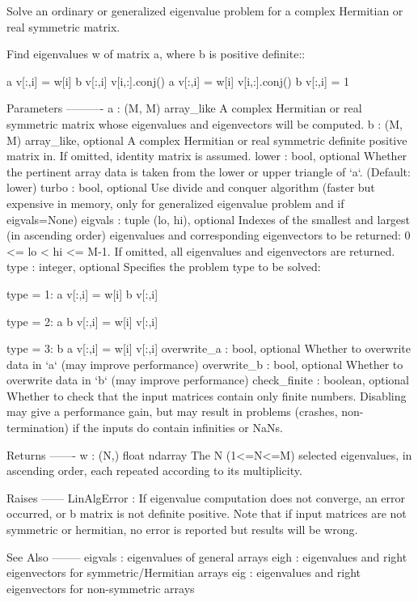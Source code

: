 \begin{DoxyVerb}Solve an ordinary or generalized eigenvalue problem for a complex
Hermitian or real symmetric matrix.

Find eigenvalues w of matrix a, where b is positive definite::

                  a v[:,i] = w[i] b v[:,i]
    v[i,:].conj() a v[:,i] = w[i]
    v[i,:].conj() b v[:,i] = 1


Parameters
----------
a : (M, M) array_like
    A complex Hermitian or real symmetric matrix whose eigenvalues and
    eigenvectors will be computed.
b : (M, M) array_like, optional
    A complex Hermitian or real symmetric definite positive matrix in.
    If omitted, identity matrix is assumed.
lower : bool, optional
    Whether the pertinent array data is taken from the lower or upper
    triangle of `a`. (Default: lower)
turbo : bool, optional
    Use divide and conquer algorithm (faster but expensive in memory,
    only for generalized eigenvalue problem and if eigvals=None)
eigvals : tuple (lo, hi), optional
    Indexes of the smallest and largest (in ascending order) eigenvalues
    and corresponding eigenvectors to be returned: 0 <= lo < hi <= M-1.
    If omitted, all eigenvalues and eigenvectors are returned.
type : integer, optional
    Specifies the problem type to be solved:

       type = 1: a   v[:,i] = w[i] b v[:,i]

       type = 2: a b v[:,i] = w[i]   v[:,i]

       type = 3: b a v[:,i] = w[i]   v[:,i]
overwrite_a : bool, optional
    Whether to overwrite data in `a` (may improve performance)
overwrite_b : bool, optional
    Whether to overwrite data in `b` (may improve performance)
check_finite : boolean, optional
    Whether to check that the input matrices contain only finite numbers.
    Disabling may give a performance gain, but may result in problems
    (crashes, non-termination) if the inputs do contain infinities or NaNs.

Returns
-------
w : (N,) float ndarray
    The N (1<=N<=M) selected eigenvalues, in ascending order, each
    repeated according to its multiplicity.

Raises
------
LinAlgError :
    If eigenvalue computation does not converge,
    an error occurred, or b matrix is not definite positive. Note that
    if input matrices are not symmetric or hermitian, no error is reported
    but results will be wrong.

See Also
--------
eigvals : eigenvalues of general arrays
eigh : eigenvalues and right eigenvectors for symmetric/Hermitian arrays
eig : eigenvalues and right eigenvectors for non-symmetric arrays\end{DoxyVerb}
 \hypertarget{namespacescipy_1_1linalg_1_1decomp_aa0d30ab6fedf9ed8716bb691ac6b749b}{}
